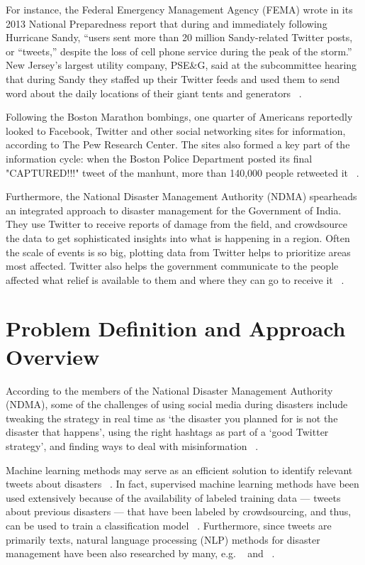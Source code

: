 For instance, the Federal Emergency Management Agency (FEMA) wrote in its 2013 National Preparedness report that during and immediately following Hurricane Sandy, “users sent more than 20 million Sandy-related Twitter posts, or “tweets,” despite the loss of cell phone service during the peak of the storm.” New Jersey’s largest utility company, PSE\&G, said at the subcommittee hearing that during Sandy they staffed up their Twitter feeds and used them to send word about the daily locations of their giant tents and generators ~\citep{scientificamer}.

Following the Boston Marathon bombings, one quarter of Americans reportedly looked to Facebook, Twitter and other social networking sites for information, according to The Pew Research Center. The sites also formed a key part of the information cycle: when the Boston Police Department posted its final "CAPTURED!!!" tweet of the manhunt, more than 140,000 people retweeted it ~\citep{scientificamer}.

Furthermore, the National Disaster Management Authority (NDMA) spearheads an integrated approach to disaster management for the Government of India. They use Twitter to receive reports of damage from the field, and crowdsource the data to get sophisticated insights into what is happening in a region. Often the scale of events is so big, plotting data from Twitter helps to prioritize areas most affected. Twitter also helps the government communicate to the people affected what relief is available to them and where they can go to receive it ~\citep{twittercrisisblog}.

\section{Problem Definition and Approach Overview}
\label{problemdefinition}

According to the members of the National Disaster Management Authority (NDMA), some of the challenges of using social media during disasters include tweaking the strategy in real time as ‘the disaster you planned for is not the disaster that happens’, using the right hashtags as part of a ‘good Twitter strategy', and finding ways to deal with misinformation ~\citep{twittercrisisblog}.

Machine learning methods may serve as an efficient solution to identify relevant tweets about disasters ~\citep{tweedr}. In fact, supervised machine learning methods have been used extensively because of the availability of labeled training data --- tweets about previous disasters --- that have been labeled by crowdsourcing, and thus, can be used to train a classification model ~\citep{starbird}. Furthermore, since tweets are primarily texts, natural language processing (NLP) methods for disaster management have been also researched by many, e.g. ~\citep{sakaki} and ~\citep{terpstra}. 

